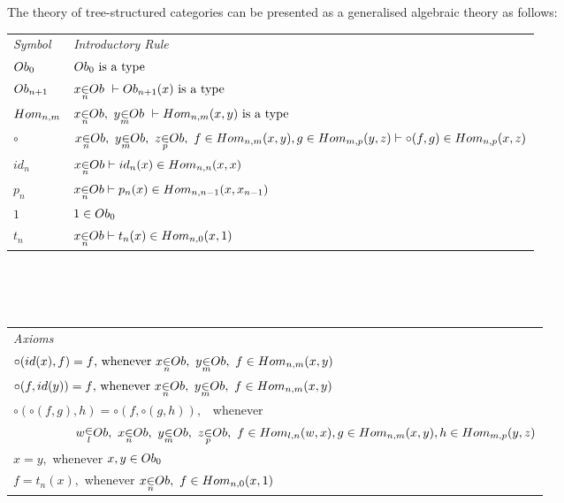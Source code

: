\documentclass[10pt,a4paper]{scrartcl}
\begin{document}
\noindent The theory of tree-structured categories can be presented as a generalised algebraic theory as follows: \\
\vspace{0.03cm} 
\begin{tabular}{>{\itshape}l l}
Symbol & \itshape{Introductory Rule} \\[0.1cm]
$Ob_{0}  $&$Ob_{0}\mbox{ is a type}$\\[0.2cm]
$Ob_{n+1} $&$\ofTn{x}{n}{\Ob} \    \tstyle \isT{\Obi{n+1}(x)} $\\ [0.25cm]
$Hom_{n,m} $ &$\ofObi{x}{n} ,\  \ofObi{y}{m} \ \tstyle \isT{\HomijBar{n}{m}{x}{y}} $\\ [0.25cm]
$\circ$ & $\ofObi{x}{n}, \  \ofObi{y}{m}, \ \ofObi{z}{p}, \ \ofHomij{f}{n}{m}{x}{y},\ofHomij{g}{m}{p}{y}{z} \tstyle \ofHomij{\circ(f,g)}{n}{p}{x}{z}$ \\ [0.25cm]
$id_n   $   & $ \ofObi{x}{n} \tstyle \ofHomij{id_n(x)}{n}{n}{x}{x} $\\ [0.25cm]
$p_n   $   & $ \ofObi{x}{n} \tstyle \ofHomij{p_n(x)}{n}{n-1}{x}{x_{n-1}} $\\ [0.25cm]
$1     $   & $1 \in Ob_{0} $\\         [0.25cm]
$t_n   $   & $ \ofObi{x}{n} \tstyle t_n(x) \in \Homij{n}{0}(x,1)$\\ [0.25cm]
\end{tabular} \\
\vspace{.1cm}  \\
\vspace{.03cm} \\
\begin{tabular}{l}
\itshape{Axioms} \\

$\circ(id(x),f)=f \mbox{,  whenever\ } \ofObi{x}{n} ,\  \ofObi{y}{m} , \ \ofHomij{f}{n}{m}{x}{y}  $\\ [0.25cm]
$\circ(f,id(y))=f \mbox{,  whenever\ } \ofObi{x}{n} ,\  \ofObi{y}{m} , \ \ofHomij{f}{n}{m}{x}{y}  $\\ [0.25cm]
$ \circ(\circ(f,g),h) = \circ(f,\circ(g,h)),$ \ whenever \\ [0.2cm]
$ \ \ \ \ \ \ \ \ \ \ \ \ \ \ \ 
\ofObi{w}{l} , \ \ofObi{x}{n} , \ \ofObi{y}{m} , \ \ofObi{z}{p}, \ 
 \ofHomij{f}{l}{n}{w}{x}, \ofHomij{g}{n}{m}{x}{y}, \ofHomij{h}{m}{p}{y}{z}$ \\ [0.25cm]
$x = y, $ whenever $x,y \in Ob_{0} $ \\ [0.25cm]
$f = t_n(x),  $ whenever $ \ofObi{x}{n}, \ f \in \Homij{n}{0}(x,1)$\\ [0.25cm]
\end{tabular}  \\
\vspace{.05cm}  \\
\end{document}
